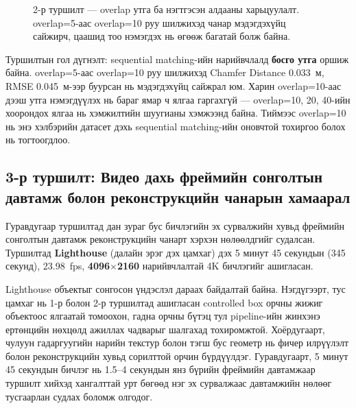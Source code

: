 \begin{figure}[H]
\centering
{}
\caption{2-р туршилт --- overlap утга ба нэгтгэсэн алдааны харьцуулалт. overlap=5-аас overlap=10 руу шилжихэд чанар мэдэгдэхүйц сайжирч, цаашид тоо нэмэгдэх нь өгөөж багатай болж байна.}
\label{fig:exp2_combined}
\end{figure}

Туршилтын гол дүгнэлт: sequential matching-ийн нарийвчлалд \textbf{босго утга} оршиж байна. overlap=5-аас overlap=10 руу шилжихэд Chamfer Distance 0.033~м, RMSE 0.045~м-ээр буурсан нь мэдэгдэхүйц сайжрал юм. Харин overlap=10-аас дээш утга нэмэгдүүлэх нь бараг ямар ч ялгаа гаргахгүй --- overlap=10, 20, 40-ийн хоорондох ялгаа нь хэмжилтийн шуугианы хэмжээнд байна. Тиймээс overlap=10 нь энэ хэлбэрийн датасет дэхь sequential matching-ийн оновчтой тохиргоо болох нь тогтоогдлоо.

\subsection{3-р туршилт: Видео дахь фреймийн сонголтын давтамж болон реконструкцийн чанарын хамаарал}

Гуравдугаар туршилтад дан зураг бус бичлэгийн эх сурвалжийн хувьд фреймийн сонголтын давтамж реконструкцийн чанарт хэрхэн нөлөөлдгийг судалсан. Туршилтад \textbf{Lighthouse} (далайн эрэг дэх цамхаг) дэх 5 минут 45 секундын (345 секунд), 23.98~fps, \textbf{4096$\times$2160} нарийвчлалтай 4K бичлэгийг ашигласан.

Lighthouse объектыг сонгосон үндэслэл дараах байдалтай байна. Нэгдүгээрт, тус цамхаг нь 1-р болон 2-р туршилтад ашигласан controlled box орчны жижиг объектоос ялгаатай томоохон, гадна орчны бүтэц тул pipeline-ийн жинхэнэ ертөнцийн нөхцөлд ажиллах чадварыг шалгахад тохиромжтой. Хоёрдугаарт, чулуун гадаргуугийн нарийн текстур болон тэгш бус геометр нь фичер илрүүлэлт болон реконструкцийн хувьд сорилттой орчин бүрдүүлдэг. Гуравдугаарт, 5 минут 45 секундын бичлэг нь 1.5–4 секундын янз бүрийн фреймийн давтамжаар туршилт хийхэд хангалттай урт бөгөөд нэг эх сурвалжаас давтамжийн нөлөөг тусгаарлан судлах боломж олгодог.

